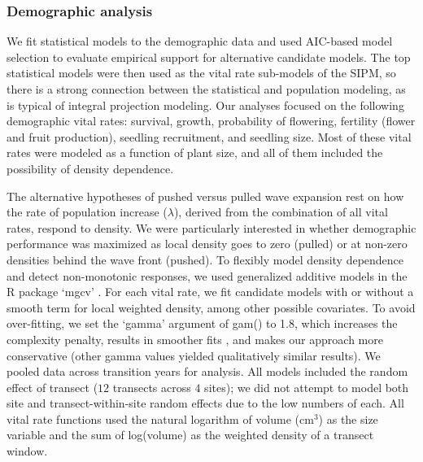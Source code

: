 \documentclass[11pt]{article}\usepackage[]{graphicx}\usepackage[]{color}
\begin{document}
\subsubsection*{Demographic analysis}
We fit statistical models to the demographic data and used AIC-based model selection to evaluate empirical support for alternative candidate models. 
The top statistical models were then used as the vital rate sub-models of the SIPM, so there is a strong connection between the statistical and population modeling, as is typical of integral projection modeling. 
Our analyses focused on the following demographic vital rates: survival, growth, probability of flowering, fertility (flower and fruit production), seedling recruitment, and seedling size. 
Most of these vital rates were modeled as a function of plant size, and all of them included the possibility of density dependence. 

The alternative hypotheses of pushed versus pulled wave expansion rest on how the rate of population increase ($\lambda$), derived from the combination of all vital rates, respond to density. 
We were particularly interested in whether demographic performance was maximized as local density goes to zero (pulled) or at non-zero densities behind the wave front (pushed). 
To flexibly model density dependence and detect non-monotonic responses, we used generalized additive models in the R package `mgcv' \citep{Wood2017}.
For each vital rate, we fit candidate models with or without a smooth term for local weighted density, among other possible covariates. 
To avoid over-fitting, we set the `gamma' argument of gam() to 1.8, which increases the complexity penalty, results in smoother fits \citep{Wood2017}, and makes our approach more conservative (other gamma values yielded qualitatively similar results).
We pooled data across transition years for analysis. 
All models included the random effect of transect ($12$ transects across $4$ sites); we did not attempt to model both site and transect-within-site random effects due to the low numbers of each. 
All vital rate functions used the natural logarithm of volume (cm$^3$) as the size variable and the sum of log(volume) as the weighted density of a transect window.
\end{document}
